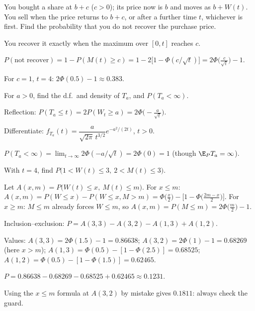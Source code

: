 \begin{problem}
You bought a share at $b+c$ ($c>0$); its price now is $b$ and moves as $b+W(t)$. You sell when the price returns to $b+c$, or after a further time $t$, whichever is first. Find the probability that you do not recover the purchase price.
\begin{steps}
  \item You recover it exactly when the maximum over $[0,t]$ reaches $c$.
  \item $P(\text{not recover})=1-P(M(t)\ge c)=1-2\big[1-\Phi(c/\sqrt t)\big]=2\Phi\big(\frac{c}{\sqrt t}\big)-1$.
\end{steps}
For $c=1$, $t=4$: $2\Phi(0.5)-1\approx0.383$.
\end{problem}

\begin{problem}
For $a>0$, find the d.f.\ and density of $T_a$, and $P(T_a<\infty)$.
\begin{steps}
  \item Reflection: $P(T_a\le t)=2P(W_t\ge a)=2\Phi\big(-\frac{a}{\sqrt t}\big)$.
  \item Differentiate: $f_{T_a}(t)=\dfrac{a}{\sqrt{2\pi}\,t^{3/2}}e^{-a^2/(2t)}$, $t>0$.
  \item $P(T_a<\infty)=\lim_{t\to\infty}2\Phi(-a/\sqrt t)=2\Phi(0)=1$ (though $\E_PT_a=\infty$).
\end{steps}
\end{problem}

\begin{problem}
\label{pr:rectangle}
With $t=4$, find $P\big(1<W(t)\le3,\ 2<M(t)\le3\big)$.
\begin{steps}
  \item Let $A(x,m)=P\big(W(t)\le x,\ M(t)\le m\big)$. For $x\le m$: $A(x,m)=P(W\le x)-P(W\le x,M>m)=\Phi\big(\frac x2\big)-\big[1-\Phi\big(\frac{2m-x}{2}\big)\big]$. For $x\ge m$: $M\le m$ already forces $W\le m$, so $A(x,m)=P(M\le m)=2\Phi\big(\frac m2\big)-1$.
  \item Inclusion--exclusion: $P=A(3,3)-A(3,2)-A(1,3)+A(1,2)$.
  \item Values: $A(3,3)=2\Phi(1.5)-1=0.86638$; $A(3,2)=2\Phi(1)-1=0.68269$ (here $x>m$); $A(1,3)=\Phi(0.5)-[1-\Phi(2.5)]=0.68525$; $A(1,2)=\Phi(0.5)-[1-\Phi(1.5)]=0.62465$.
  \item $P=0.86638-0.68269-0.68525+0.62465\approx0.1231$.
\end{steps}
Using the $x\le m$ formula at $A(3,2)$ by mistake gives $0.1811$: always check the guard.
\end{problem}

